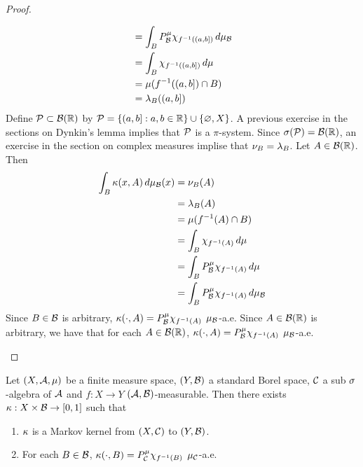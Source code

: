 \documentclass{book}
\begin{document}
\begin{proof}
\begin{enumerate}
\begin{align*}
				& = \int_{B} P^{\mu}_{\mathcal{B}}\chi_{f^{-1}((a, b])} \, d \mu_{\mathcal{B}} \\
				& = \int_{B} \chi_{f^{-1}((a, b])} \, d \mu  \\
				& = \mu(f^{-1}((a, b]) \cap B) \\
				& = \lambda_{B}((a,b])
			\end{align*}
			Define $\mathcal{P} \subset \mathcal{B}(\mathbb{R})$ by $\mathcal{P} = \{(a,b]: a,b \in \mathbb{R}\} \cup \{\varnothing, X\}$. A previous exercise in the sections on Dynkin's lemma implies that $\mathcal{P}$ is a $\pi$-system. Since $\sigma(\mathcal{P}) = \mathcal{B}(\mathbb{R})$, an exercise in the section on complex measures implise that $\nu_{B} = \lambda_{B}$. Let $A \in \mathcal{B}(\mathbb{R})$. Then 
			\begin{align*}
				\int_B \kappa(x, A) \, d \mu_{\mathcal{B}}(x) 
				& = \nu_B(A) \\
				& = \lambda_{B}(A) \\
				& =  \mu(f^{-1}(A) \cap B) \\
				& = \int_B \chi_{f^{-1}(A)} \, d \mu \\
				& = \int_B P^{\mu}_{\mathcal{B}} \chi_{f^{-1}(A)} \, d \mu \\
				& = \int_B P^{\mu}_{\mathcal{B}} \chi_{f^{-1}(A)} \, d \mu_{\mathcal{B}} \\
			\end{align*}
			Since $B \in \mathcal{B}$ is arbitrary, $\kappa(\cdot, A) = P^{\mu}_{\mathcal{B}} \chi_{f^{-1}(A)}$ $\mu_{\mathcal{B}}$-a.e. Since $A \in \mathcal{B}(\mathbb{R})$ is arbitrary, we have that for each $A \in \mathcal{B}(\mathbb{R})$, $\kappa(\cdot, A) = P^{\mu}_{\mathcal{B}} \chi_{f^{-1}(A)}$ $\mu_{\mathcal{B}}$-a.e.
		\end{enumerate}
	\end{proof}

	\begin{ex}
			Let $(X, \mathcal{A}, \mu)$ be a finite measure space, $(Y, \mathcal{B})$ a standard Borel space, $\mathcal{C}$ a sub $\sigma$-algebra of $\mathcal{A}$ and $f: X \rightarrow Y$ $(\mathcal{A}, \mathcal{B})$-measurable. Then there exists $\kappa: X \times \mathcal{B} \rightarrow [0,1]$ such that 
		\begin{enumerate}
			\item $\kappa$ is a Markov kernel from $(X, \mathcal{C})$ to $(Y, \mathcal{B})$.
			\item For each $B \in \mathcal{B}$, $\kappa(\cdot, B) = P^{\mu}_{\mathcal{C}}\chi_{f^{-1}(B)}$ $\mu_{\mathcal{C}}$-a.e.
		\end{enumerate}
	\end{ex}
\end{document}
